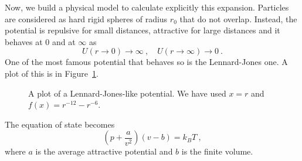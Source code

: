     Now, we build a physical model to calculate explicitly this expansion. Particles are considered as hard rigid spheres of radius $r_0$ that do not overlap. Instead, the potential is repulsive for small distances, attractive for large distances and it behaves at $0$ and at $\infty$ as
    \begin{equation*}
        U(r \rightarrow 0) \rightarrow \infty ~, \quad U(r \rightarrow \infty) \rightarrow 0~.
    \end{equation*}
    One of the most famous potential that behaves so is the Lennard-Jones one. A plot of this is in Figure~\ref{gran:lj}.
    \begin{figure}
        \centering
        \caption{A plot of a Lennard-Jones-like potential. We have used $x = r$ and $f(x) = r^{-12} - r^{-6}$.}
        \label{gran:lj}
    \end{figure}
    The equation of state becomes 
    \begin{equation*}
        (p + \frac{a}{v^2}) (v - b) = k_B T ~,
    \end{equation*}
    where $a$ is the average attractive potential and $b$ is the finite volume.
